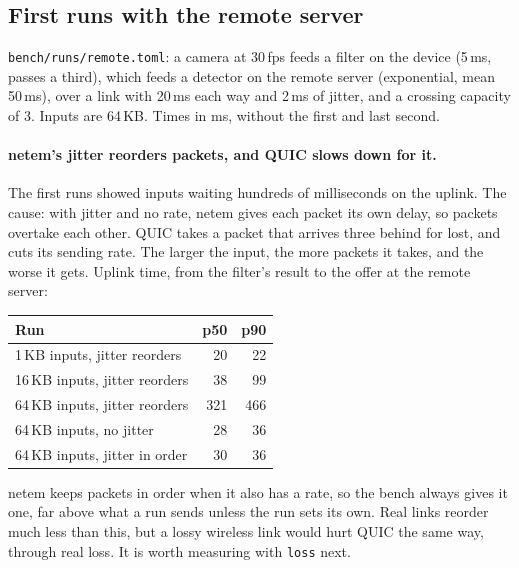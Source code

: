 \documentclass[11pt]{article}
\newcommand{\code}[1]{\texttt{#1}}
\begin{document}
\subsection{First runs with the remote server}

\code{bench/runs/remote.toml}: a camera at 30\,fps feeds a filter on the
device (5\,ms, passes a third), which feeds a detector on the remote server
(exponential, mean 50\,ms), over a link with 20\,ms each way and 2\,ms of
jitter, and a crossing capacity of 3. Inputs are 64\,KB. Times in ms,
without the first and last second.

\paragraph{netem's jitter reorders packets, and QUIC slows down for it.} The
first runs showed inputs waiting hundreds of milliseconds on the uplink. The
cause: with jitter and no rate, netem gives each packet its own delay, so
packets overtake each other. QUIC takes a packet that arrives three behind
for lost, and cuts its sending rate. The larger the input, the more packets
it takes, and the worse it gets. Uplink time, from the filter's result to the
offer at the remote server:
\begin{center}
\small
\begin{tabular}{@{}lrr@{}}
\toprule
Run & p50 & p90 \\
\midrule
1\,KB inputs, jitter reorders     & 20  & 22 \\
16\,KB inputs, jitter reorders    & 38  & 99 \\
64\,KB inputs, jitter reorders    & 321 & 466 \\
64\,KB inputs, no jitter          & 28  & 36 \\
64\,KB inputs, jitter in order    & 30  & 36 \\
\bottomrule
\end{tabular}
\end{center}
netem keeps packets in order when it also has a rate, so the bench always
gives it one, far above what a run sends unless the run sets its own. Real
links reorder much less than this, but a lossy wireless link would hurt QUIC
the same way, through real loss. It is worth measuring with \code{loss}
next.
\end{document}
